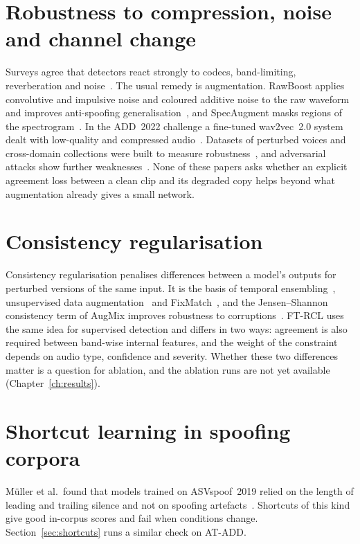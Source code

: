 \section{Robustness to compression, noise and channel change}

Surveys agree that detectors react strongly to codecs, band-limiting, reverberation and noise~\cite{zhang2025sensorsSurvey,alnaqbi2026systematic}. The usual remedy is augmentation. RawBoost applies convolutive and impulsive noise and coloured additive noise to the raw waveform and improves anti-spoofing generalisation~\cite{tak2022rawboost}, and SpecAugment masks regions of the spectrogram~\cite{park2019specaugment}. In the ADD~2022 challenge a fine-tuned wav2vec~2.0 system dealt with low-quality and compressed audio~\cite{martindonas2022vicomtech}. Datasets of perturbed voices and cross-domain collections were built to measure robustness~\cite{gao2024p2v,li2024crossdomain}, and adversarial attacks show further weaknesses~\cite{rabhi2024adversarial}. None of these papers asks whether an explicit agreement loss between a clean clip and its degraded copy helps beyond what augmentation already gives a small network.

\section{Consistency regularisation}

Consistency regularisation penalises differences between a model's outputs for perturbed versions of the same input. It is the basis of temporal ensembling~\cite{laine2017temporal}, unsupervised data augmentation~\cite{xie2020uda} and FixMatch~\cite{sohn2020fixmatch}, and the Jensen--Shannon consistency term of AugMix improves robustness to corruptions~\cite{hendrycks2020augmix}. FT-RCL uses the same idea for supervised detection and differs in two ways: agreement is also required between band-wise internal features, and the weight of the constraint depends on audio type, confidence and severity. Whether these two differences matter is a question for ablation, and the ablation runs are not yet available (Chapter~\ref{ch:results}).

\section{Shortcut learning in spoofing corpora}

M\"uller et al.\ found that models trained on ASVspoof~2019 relied on the length of leading and trailing silence and not on spoofing artefacts~\cite{muller2021silver}. Shortcuts of this kind give good in-corpus scores and fail when conditions change. Section~\ref{sec:shortcuts} runs a similar check on AT-ADD.


